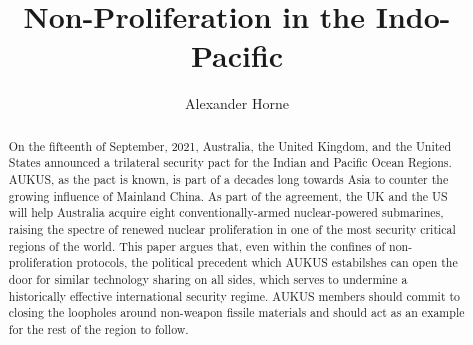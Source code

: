 \documentclass[letterpaper,12pt,twoside]{article} %
\title{\display Non-Proliferation in the Indo-Pacific}
\author{Alexander Horne}
\date{} %
\begin{document}
\begin{titlepage}
  \maketitle
\vfill

\renewcommand{\abstractname}{\sc\large Executive Summary}
\begin{abstract}

    On the fifteenth of September, 2021, Australia, the United Kingdom, and the United States announced a trilateral security pact for the Indian and Pacific Ocean Regions. AUKUS, as the pact is known, is part of a decades long  towards Asia to counter the growing influence of Mainland China. As part of the agreement, the UK and the US will help Australia acquire eight conventionally-armed nuclear-powered submarines, raising the spectre of renewed nuclear proliferation in one of the most security critical regions of the world. This paper argues that, even within the confines of non-proliferation protocols, the political precedent which AUKUS estabilshes can open the door for similar technology sharing on all sides, which serves to undermine a historically effective international security regime. AUKUS members should commit to closing the loopholes around non-weapon fissile materials and should act as an example for the rest of the region to follow.

\end{abstract}

\end{titlepage}

{\hypersetup{hidelinks}
  \tableofcontents
}
  \vfill
  \pagebreak
\end{document}

